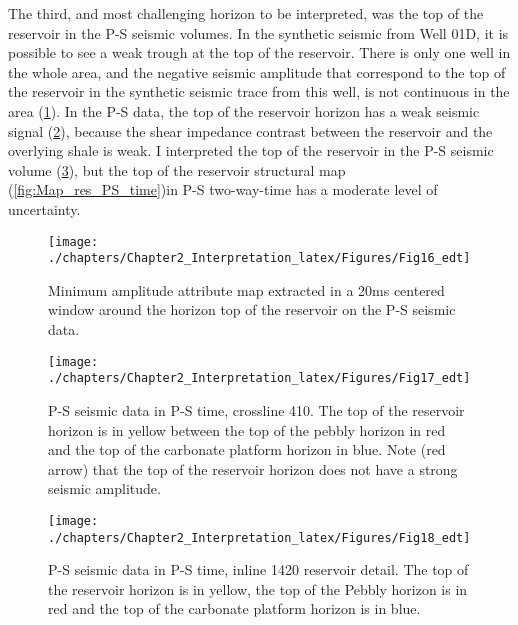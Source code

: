 The third, and most challenging horizon to be interpreted, was the top of the reservoir in the P-S seismic volumes. In the synthetic seismic from Well 01D, it is possible to see a weak trough at the top of the reservoir. There is only one well in the whole area, and the negative seismic amplitude that correspond to the top of the reservoir in the synthetic seismic trace from this well, is not continuous in the area (\ref{fig:map_PS_res_amp}). In the P-S data, the top of the reservoir horizon has a weak seismic signal (\ref{fig:xline_410_zoom}), because the shear impedance contrast between the reservoir and the overlying shale is weak. I interpreted the top of the reservoir in the P-S seismic volume (\ref{fig:inline_1420_zoom}), but the top of the reservoir structural map (\ref{fig:Map_res_PS_time})in P-S two-way-time has a moderate level of uncertainty. 

\begin{figure}[hbtp]
	\begin{center}
	\texttt{[image: ./chapters/Chapter2\_Interpretation\_latex/Figures/Fig16\_edt]}
			\caption[Minimum amplitude or most negative attribute map extracted in a 20ms centered window around the horizon top of the reservoir on the P-S seismic data. ]{Minimum amplitude attribute map extracted in a 20ms centered window around the horizon top of the reservoir on the P-S seismic data. }
			\label{fig:map_PS_res_amp}
		\end{center}
	\end{figure}


\begin{figure}[hbtp]
	\begin{center}
	\texttt{[image: ./chapters/Chapter2\_Interpretation\_latex/Figures/Fig17\_edt]}
			\caption[P-S seismic data in P-S time, crossline 410.]{P-S seismic data in P-S time, crossline 410. The top of the reservoir horizon is in yellow between the top of the pebbly horizon in red and the top of the carbonate platform horizon in blue. Note (red arrow) that the top of the reservoir horizon does not have a strong seismic amplitude.}
			\label{fig:xline_410_zoom}
		\end{center}
	\end{figure}

\begin{figure}[hbtp]
	\begin{center}
	\texttt{[image: ./chapters/Chapter2\_Interpretation\_latex/Figures/Fig18\_edt]}
			\caption[P-S seismic data in P-S time, inline 1420 reservoir detail.]{P-S seismic data in P-S time, inline 1420 reservoir detail. The top of the reservoir horizon is in yellow, the top of the Pebbly horizon is in red and the top of the carbonate platform horizon is in blue.}
			\label{fig:inline_1420_zoom}
		\end{center}
	\end{figure}

